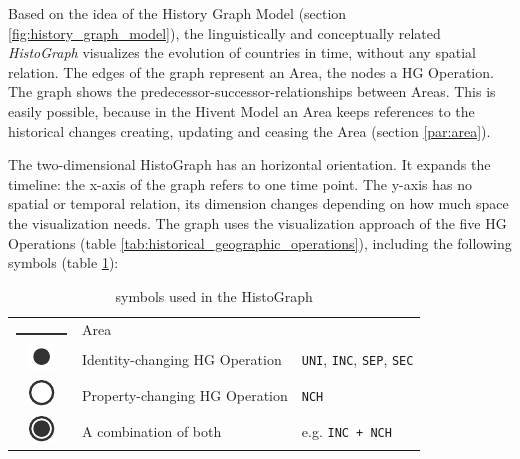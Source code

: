 Based on the idea of the History Graph Model (section \ref{fig:history_graph_model}), the linguistically and conceptually related \emph{HistoGraph} visualizes the evolution of countries in time, without any spatial relation. The edges of the graph represent an Area, the nodes a HG Operation. The graph shows the predecessor-successor-relationships between Areas. This is easily possible, because in the Hivent Model an Area keeps references to the historical changes creating, updating and ceasing the Area (section \ref{par:area}).

The two-dimensional HistoGraph has an horizontal orientation. It expands the timeline: the x-axis of the graph refers to one time point. The y-axis has no spatial or temporal relation, its dimension changes depending on how much space the visualization needs. The graph uses the visualization approach of the five HG Operations (table \ref{tab:historical_geographic_operations}), including the following symbols (table \ref{tab:histograph_symbols}):

\begin{table}[H]
\begin{center}
\begin{tabular}{c l l}

  \raisebox{3.5\height}
  {\includegraphics{graphics/development/histograph/line}}
  & Area
  & \\

  \raisebox{-0.2\height}
  {\includegraphics{graphics/development/histograph/circle_filled}}
  & Identity-changing HG Operation
  & \texttt{UNI}, \texttt{INC}, \texttt{SEP}, \texttt{SEC} \\

  \raisebox{-0.2\height}
  {\includegraphics{graphics/development/histograph/circle_unfilled}}
  & Property-changing HG Operation
  & \texttt{NCH} \\

  \raisebox{-0.2\height}
  {\includegraphics{graphics/development/histograph/circle_combo}}
  & A combination of both
  & e.g. \texttt{INC + NCH}

\end{tabular}
\caption{symbols used in the HistoGraph}
\label{tab:histograph_symbols}
\end{center}
\end{table}

